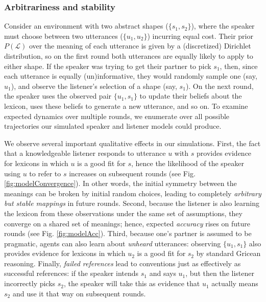 \documentclass[manuscript]{stjour}
\begin{document}
\subsubsection{Arbitrariness and
stability}\label{arbitrariness-and-stability-1}

Consider an environment with two abstract shapes (\(\{s_1, s_2\}\)),
where the speaker must choose between two utterances (\(\{u_1, u_2\}\))
incurring equal cost. Their prior \(P(\mathcal{L})\) over the meaning of
each utterance is given by a (discretized) Dirichlet distribution, so on
the first round both utterances are equally likely to apply to either
shape. If the speaker was trying to get their partner to pick \(s_1\),
then, since each utterance is equally (un)informative, they would
randomly sample one (say, \(u_1\)), and observe the listener's selection
of a shape (say, \(s_1\)). On the next round, the speaker uses the
observed pair \(\{u_1, s_1\}\) to update their beliefs about the
lexicon, uses these beliefs to generate a new utterance, and so on. To
examine expected dynamics over multiple rounds, we enumerate over all
possible trajectories our simulated speaker and listener models could
produce.

We observe several important qualitative effects in our simulations.
First, the fact that a knowledgeable listener responds to utterance
\(u\) with \(s\) provides evidence for lexicons in which \(u\) is a good
fit for \(s\), hence the likelihood of the speaker using \(u\) to refer
to \(s\) increases on subsequent rounds (see
Fig.\ref{fig:modelConvergence}). In other words, the initial symmetry
between the meanings can be broken by initial random choices, leading to
completely \emph{arbitrary but stable mappings} in future rounds.
Second, because the listener is also learning the lexicon from these
observations under the same set of assumptions, they converge on a
shared set of meanings; hence, expected \emph{accuracy} rises on future
rounds (see Fig. \ref{fig:modelAcc}). Third, because one's partner is
assumed to be pragmatic, agents can also learn about \emph{unheard}
utterances: observing \(\{u_1, s_1\}\) also provides evidence for
lexicons in which \(u_2\) is a good fit for \(s_2\) by standard Gricean
reasoning. Finally, \emph{failed references} lead to conventions just as
effectively as successful references: if the speaker intends \(s_1\) and
says \(u_1\), but then the listener incorrectly picks \(s_2\), the
speaker will take this as evidence that \(u_1\) actually means \(s_2\)
and use it that way on subsequent rounds.
\end{document}

